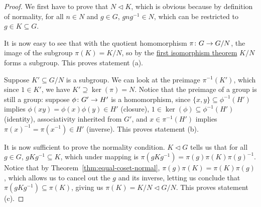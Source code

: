 \begin{proof}
    We first have to prove that \(N \lhd K\),
    which is obvious because by definition of normality,
    for all \(n \in N\) and \(g \in G\),
    \(gng^{-1} \in N\), which can be restricted to \(g \in K \subseteq G\).

    It is now easy to see that
    with the quotient homomorphism \(\pi\colon G\to G/N\),
    the image of the subgroup \(\pi(K) = K/N\),
    so by the \hyperref[thm:iso-1-group]{first isomorphism theorem}
    \(K/N\) forms a subgroup.
    This proves statement (a).


    \medskip

    Suppose \(K' \subseteq G/N\) is a subgroup.
    We can look at the preimage \(\pi^{-1}(K')\),
    which since \(1 \in K'\), we have \(K' \supseteq \ker(\pi) = N\).
    Notice that the preimage of a group is still a group:
    suppose \(\phi\colon G'\to H'\) is a homomorphism,
    since \(\{x,y\}\subseteq\phi^{-1}(H')\)
    implies \(\phi(xy) = \phi(x)\phi(y) \in H'\) (closure),
    \(1 \in \ker(\phi) \subseteq \phi^{-1}(H')\) (identity),
    associativity inherited from \(G'\),
    and \(x \in \pi^{-1}(H')\)
    implies \({\pi(x)}^{-1} = \pi(x^{-1}) \in H'\) (inverse).
    This proves statement (b).

    \medskip

    It is now sufficient to prove the normality condition.
    \(K \lhd G\) tells us that for all \(g \in G\), \(gKg^{-1} \subseteq K\),
    which under mapping is \(\pi(gKg^{-1}) = \pi(g)\pi(K){\pi(g)}^{-1}\).
    Notice that by Theorem~\ref{thm:equal-coset-normal},
    \(\pi(g)\pi(K) = \pi(K)\pi(g)\),
    which allows us to cancel out the \(g\) and its inverse,
    letting us conclude that \(\pi(gKg^{-1}) \subseteq \pi(K)\),
    giving us \(\pi(K) = K/N \lhd G/N\).
    This proves statement (c).


\end{proof}
